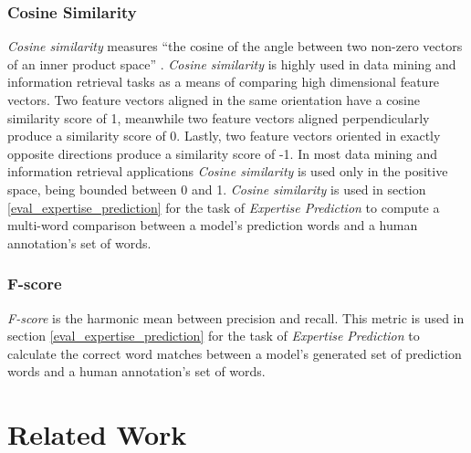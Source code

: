         \subsubsection{Cosine Similarity}
            \emph{Cosine similarity} measures ``the cosine of the angle between two non-zero vectors of an inner product space'' \cite{cosSim_def}. \emph{Cosine similarity} is highly used in data mining and information retrieval tasks as a means of comparing high dimensional feature vectors. Two feature vectors aligned in the same orientation have a cosine similarity score of 1, meanwhile two feature vectors aligned perpendicularly produce a similarity score of 0. Lastly, two feature vectors oriented in exactly opposite directions produce a similarity score of -1. In most data mining and information retrieval applications \emph{Cosine similarity} is used only in the positive space, being bounded between 0 and 1. \emph{Cosine similarity} is used in section \ref{eval_expertise_prediction} for the task of \emph{Expertise Prediction} to compute a multi-word comparison between a model's prediction words and a human annotation's set of words.
            
        \subsubsection{F-score}
            \emph{F-score} is the harmonic mean between precision and recall. This metric is used in section \ref{eval_expertise_prediction} for the task of \emph{Expertise Prediction} to calculate the correct word matches between a model's generated set of prediction words and a human annotation's set of words.
            

\section{Related Work}\label{sec:relatedWork}

